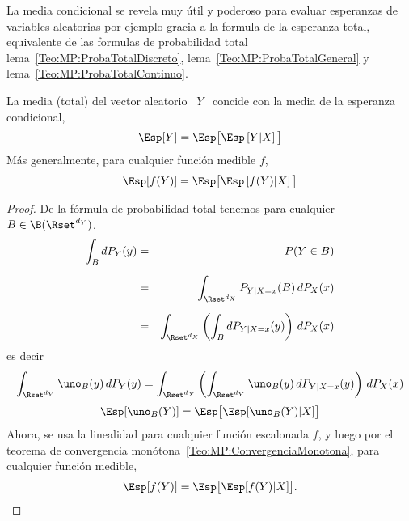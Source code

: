 La media condicional se revela muy  \'util y poderoso para evaluar esperanzas de
variables  aleatorias por ejemplo  gracia a  la formula  de la  esperanza total,
equivalente      de      las       formulas      de      probabilidad      total
lema~\ref{Teo:MP:ProbaTotalDiscreto},    lema~\ref{Teo:MP:ProbaTotalGeneral}   y
lema~\ref{Teo:MP:ProbaTotalContinuo}.
%
\begin{teorema}\label{Teo:MP:EsperanzaTotal}
%
  La media  (total) del  vector aleatorio  \ $Y$ \  concide con  la media  de la
  esperanza condicional, \ie
  \[
  \Esp[Y] = \Esp\big[ \Esp\left[ Y | X\right] \big]
  \]
  M\'as generalmente, para cualquier funci\'on medible $f$,
  \[
  \Esp[f(Y)] = \Esp\big[ \Esp\left[ f(Y) | X\right] \big]
  \]
\end{teorema}
%
\begin{proof}
  De  la  f\'ormula  de probabilidad  total  tenemos  para  cualquier \  $B  \in
  \B(\Rset^{d_Y})$,
  \begin{eqnarray*}
  \int_B dP_Y(y) & = & P(Y \in B)\\[2mm]
  & = & \int_{\Rset^{d_X}} P_{Y|X=x}(B) \, dP_X(x)\\[2mm]
  & = & \int_{\Rset^{d_X}} \left( \int_B dP_{Y|X=x}(y) \right) \, dP_X(x)
  \end{eqnarray*}
  es decir
  \[
  \int_{\Rset^{d_Y}}   \uno_B(y)   \,   dP_Y(y)   =   \int_{\Rset^{d_X}}   \left(
    \int_{\Rset^{d_Y}} \uno_B(y) \, dP_{Y|X=x}(y) \right) \, dP_X(x)
  \]
  \ie
  \[
  \Esp[ \uno_B(Y) ] = \Esp\big[ \Esp[ \uno_B(Y) | X ] \big]
  \]
  Ahora, se usa  la linealidad para cualquier funci\'on  escalonada $f$, y luego
  por  el teorema de  convergencia mon\'otona~\ref{Teo:MP:ConvergenciaMonotona},
  para cualquier funci\'on medible,
  \[
  \Esp[ f(Y) ] = \Esp\big[ \Esp[ f(Y) | X ] \big].
  \]
\end{proof}

